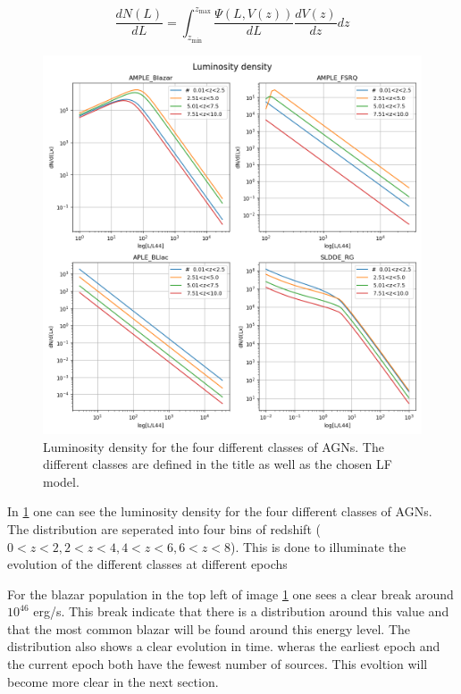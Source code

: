 \documentclass{article}
\begin{document}
\begin{equation}
    \frac{dN(L)}{dL} = \int_{z_{\text{min}}}^{z_{\text{max}}} \frac{\Psi(L, V(z))}{dL} \frac{dV(z)}{dz} dz
\end{equation}


\begin{figure}
    \centering
    \includegraphics[width = \textwidth]{Luminosirt density.png}
    \caption{Luminosity density for the four different classes of AGNs. The different classes are defined in the title as well as the chosen LF model.}
    \label{fig:LD}
\end{figure}

In \ref{fig:LD} one can see the luminosity density for the four different classes of AGNs. The distribution are 
seperated into four bins of redshift ($0<z<2,2<z<4,4<z<6,6<z<8$). This is done to illuminate the evolution of the different classes at different 
epochs

For the blazar population in the top left of image \ref{fig:LD} one sees a clear break around $10^{46}$ erg/s. This break indicate that there is a distribution
around this value and that the most common blazar will be found around this energy level. The distribution also shows a clear evolution in time. wheras the earliest epoch
and the current epoch both have the fewest number of sources. This evoltion will become more clear in the next section.
\end{document}
